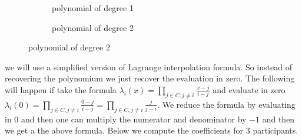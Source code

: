 \begin{figure}[H]
    \centering
    \captionsetup[subfigure]{labelformat=empty}
    \begin{subfigure}[b]{0.3\textwidth}
        \caption{polynomial of degree 1}
    \end{subfigure}
    \qquad %
    \qquad %
    \qquad %
    \qquad %
    \begin{subfigure}[b]{0.3\textwidth}
        \caption{polynomial of degree 2}
    \end{subfigure}
\end{figure}


 we will use a simplified version of Lagrange interpolation formula. So instead of recovering the polynomium we just recover the evaluation in zero. The following will happen if take the formula \begin{math} \lambda_i(x)=\prod\limits_{j\in C,j\neq i}  \frac{x-j}{i-j} \end{math} and evaluate in zero \begin{math} \lambda_i(0)=\prod\limits_{j\in C,j\neq i}  \frac{0-j}{i-j} = \prod\limits_{j\in C,j\neq i} \frac{j}{j-i} \end{math}. We reduce the formula by evaluating in $0$ and then one can multiply the numerator and denominator by $-1$ and then we get a the above formula. Below we compute the coefficients for 3 participants.


